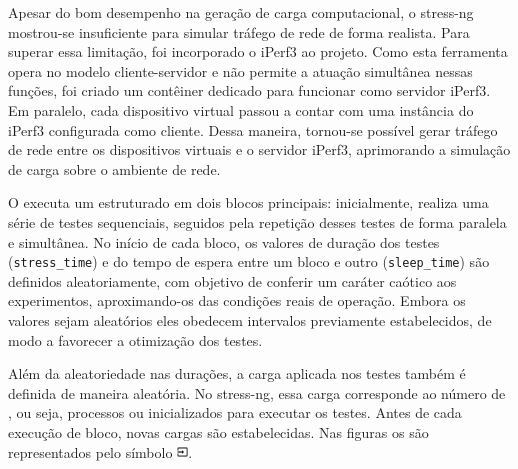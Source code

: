 Apesar do bom desempenho na geração de carga computacional, o stress-ng mostrou-se insuficiente para simular tráfego de rede de forma realista. Para superar essa limitação, foi incorporado o iPerf3 ao projeto. Como esta ferramenta opera no modelo cliente-servidor e não permite a atuação simultânea nessas funções, foi criado um contêiner dedicado para funcionar como servidor iPerf3. Em paralelo, cada dispositivo virtual passou a contar com uma instância do iPerf3 configurada como cliente. Dessa maneira, tornou-se possível gerar tráfego de rede entre os dispositivos virtuais e o servidor iPerf3, aprimorando a simulação de carga sobre o ambiente de rede.

O  executa um  estruturado em dois blocos principais: inicialmente, realiza uma série de testes sequenciais, seguidos pela repetição desses testes de forma paralela e simultânea. No início de cada bloco, os valores de duração dos testes (\verb|stress_time|) e do tempo de espera entre um bloco e outro (\verb|sleep_time|) são definidos aleatoriamente, com objetivo de conferir um caráter caótico aos experimentos, aproximando-os das condições reais de operação. Embora os valores sejam aleatórios eles obedecem intervalos previamente estabelecidos, de modo a favorecer a otimização dos testes.

Além da aleatoriedade nas durações, a carga aplicada nos testes também é definida de maneira aleatória. No stress-ng, essa carga corresponde ao número de , ou seja, processos ou  inicializados para executar os testes. Antes de cada execução de bloco, novas cargas são estabelecidas. Nas figuras os  são representados pelo símbolo \includegraphics[height=0.8em]{Imagens/chap03/input_black.png}.


